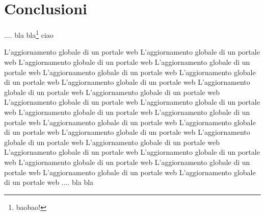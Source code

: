 \chapter*{Conclusioni}

 .... bla bla\footnote{baobao!}
ciao

L'aggiornamento globale di un portale web L'aggiornamento globale di un portale web L'aggiornamento globale di un portale web L'aggiornamento globale di un portale web L'aggiornamento globale di un portale web L'aggiornamento globale di un portale web L'aggiornamento globale di un portale web L'aggiornamento globale di un portale web L'aggiornamento globale di un portale web L'aggiornamento globale di un portale web L'aggiornamento globale di un portale web L'aggiornamento globale di un portale web L'aggiornamento globale di un portale web L'aggiornamento globale di un portale web L'aggiornamento globale di un portale web L'aggiornamento globale di un portale web L'aggiornamento globale di un portale web L'aggiornamento globale di un portale web L'aggiornamento globale di un portale web L'aggiornamento globale di un portale web L'aggiornamento globale di un portale web L'aggiornamento globale di un portale web L'aggiornamento globale di un portale web L'aggiornamento globale di un portale web
 .... bla bla